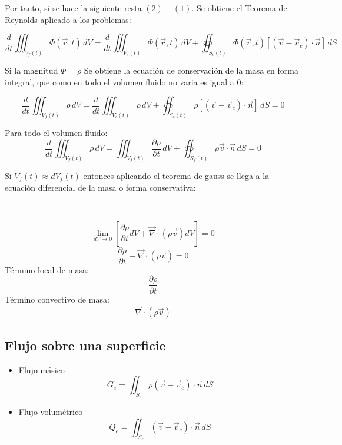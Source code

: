 Por tanto, si se hace la siguiente resta $(2)-(1)$. Se obtiene el Teorema de Reynolds aplicado a los problemas:

\[\frac{d}{dt}\iiint_{V_f(t)}\Phi(\vec{r},t)\,dV=\frac{d}{dt}\iiint_{V_c(t)}\Phi(\vec{r},t)\,dV+\oiint_{S_c(t)} \Phi(\vec{r},t)\left[(\vec{v}-\vec{v}_c)\cdot\vec{n}\right] \,dS\]



Si la magnitud $\Phi = \rho$ Se obtiene la ecuación de conservación de la masa en forma integral, que como en todo el volumen fluido no varia es igual a 0:

\[\frac{d}{dt}\iiint_{V_f(t)}\rho\,dV=\frac{d}{dt}\iiint_{V_c(t)}\rho\,dV+\oiint_{S_c(t)} \rho\left[(\vec{v}-\vec{v}_c)\cdot\vec{n}\right] \,dS=0\]

Para todo el volumen fluido:
\[\frac{d}{dt}\iiint_{V_f(t)} \rho \,dV=\iiint_{V_f(t)} \frac{\partial \rho}{\partial t} \,dV+\oiint_{S_f(t)} \rho\vec{v}\cdot\vec{n} \,dS=0\]

Si $V_f(t)\approx dV_f(t)$ entonces aplicando el teorema de gauss se llega a la ecuación diferencial de la masa o forma conservativa:

\
\
\
\begin{center}
\end{center}

\[\lim_{dV \to 0}\left[\frac{\partial \rho}{\partial t} dV+\vec{\nabla}\cdot\left(\rho\vec{v}\right)dV\right]=0\]
\[\frac{\partial \rho}{\partial t} +\vec{\nabla}\cdot\left(\rho\vec{v}\right)=0\]
Término local de masa: 
\[\frac{\partial \rho}{\partial t}\]
Término convectivo de masa:
\[\vec{\nabla}\cdot\left(\rho\vec{v}\right)\]

\subsection{Flujo sobre una superficie}
\begin{itemize}
	\item Flujo másico
	\[G_e=\iint_{S_e} \rho\left(\vec{v}-\vec{v}_c\right)\cdot\vec{n}\,dS\]
	\item Flujo volumétrico
		\[Q_e=\iint_{S_e} \left(\vec{v}-\vec{v}_c\right)\cdot\vec{n}\,dS\]
\end{itemize}

